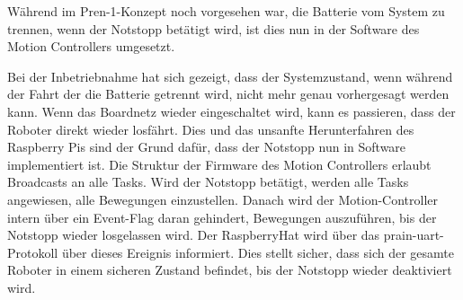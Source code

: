 \documentclass[main.tex]{subfiles} %
\begin{document}
Während im Pren-1-Konzept noch vorgesehen war, die Batterie vom System zu
trennen, wenn der Notstopp betätigt wird, ist dies nun in der Software des
Motion Controllers umgesetzt.

Bei der Inbetriebnahme hat sich gezeigt, dass der Systemzustand, wenn während
der Fahrt der die Batterie getrennt wird, nicht mehr genau vorhergesagt werden
kann. Wenn das Boardnetz wieder eingeschaltet wird, kann es passieren, dass der
Roboter direkt wieder losfährt. Dies und das unsanfte Herunterfahren des
Raspberry Pis sind der Grund dafür, dass der Notstopp nun in Software
implementiert ist. Die Struktur der Firmware des Motion Controllers erlaubt
Broadcasts an alle Tasks. Wird der Notstopp betätigt, werden alle Tasks
angewiesen, alle Bewegungen einzustellen. Danach wird der Motion-Controller
intern über ein Event-Flag daran gehindert, Bewegungen auszuführen, bis der
Notstopp wieder losgelassen wird. Der RaspberryHat wird über das
prain-uart-Protokoll über dieses Ereignis informiert. Dies stellt sicher, dass
sich der gesamte Roboter in einem sicheren Zustand befindet, bis der Notstopp
wieder deaktiviert wird.
\end{document}
